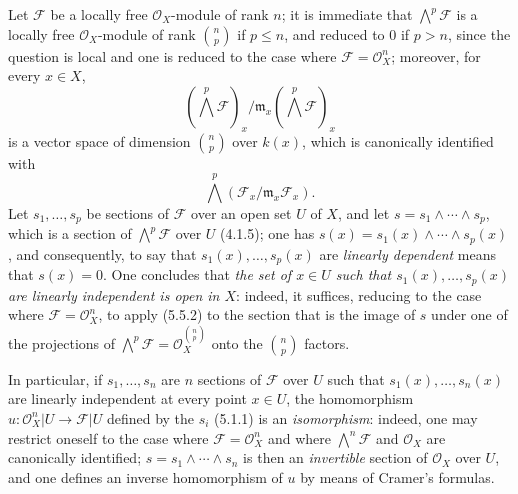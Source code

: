 \begin{env}[5.5.4]
\label{0.5.5.4}
Let $\mathcal{F}$ be a locally free $\mathcal{O}_X$-module of rank $n$;
it is immediate that $\bigwedge^p\mathcal{F}$ is a locally free
$\mathcal{O}_X$-module of rank $\binom{n}{p}$ if $p\leq n$, and reduced to $0$ if $p>n$,
since the question is local and one is reduced to the case where
$\mathcal{F}=\mathcal{O}_X^n$; moreover, for every $x\in X$,
\[
  (\bigwedge^p\mathcal{F})_x/
  \mathfrak{m}_x(\bigwedge^p\mathcal{F})_x
\]
is a vector space of dimension $\binom{n}{p}$ over $k(x)$, which
is canonically identified with
\[
  \bigwedge^p(\mathcal{F}_x/\mathfrak{m}_x\mathcal{F}_x).
\]
Let
$s_1,\ldots,s_p$ be sections of $\mathcal{F}$ over an open set $U$ of $X$, and
let $s=s_1\wedge\cdots\wedge s_p$, which is a section of
$\bigwedge^p\mathcal{F}$ over $U$ (4.1.5); one has
$s(x)=s_1(x)\wedge\cdots\wedge s_p(x)$, and consequently, to say that
$s_1(x),\ldots,s_p(x)$ are \emph{linearly dependent} means that
$s(x)=0$. One concludes that \emph{the set of $x\in U$ such that
$s_1(x),\ldots,s_p(x)$ are linearly independent is open in
$X$}: indeed, it suffices, reducing to the case where
$\mathcal{F}=\mathcal{O}_X^n$, to apply (5.5.2) to the section that is the image of $s$
under one of the projections of
$\bigwedge^p\mathcal{F}=\mathcal{O}_X^{\binom{n}{p}}$ onto the
$\binom{n}{p}$ factors.

In particular, if $s_1,\ldots,s_n$ are $n$ sections of $\mathcal{F}$
over $U$ such that $s_1(x),\ldots,s_n(x)$ are linearly
independent at every point $x\in U$, the homomorphism
$u:\mathcal{O}_X^n|U\to\mathcal{F}|U$ defined by the $s_i$ (5.1.1) is an
\emph{isomorphism}: indeed, one may restrict oneself to the case where
$\mathcal{F}=\mathcal{O}_X^n$ and where
$\bigwedge^n\mathcal{F}$ and $\mathcal{O}_X$ are canonically identified;
$s=s_1\wedge\cdots\wedge s_n$ is then an \emph{invertible} section of $\mathcal{O}_X$
over $U$, and one defines an inverse homomorphism
of $u$ by means of Cramer's formulas.
\end{env}

